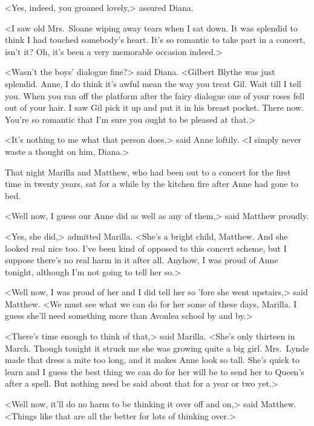 <Yes, indeed, you groaned lovely,> assured Diana.

<I saw old Mrs.~Sloane wiping away tears when I sat down. It was splendid to think I had touched somebody's heart. It's so romantic to take part in a concert, isn't it? Oh, it's been a very memorable occasion indeed.>

<Wasn't the boys' dialogue fine?> said Diana. <Gilbert Blythe was just splendid. Anne, I do think it's awful mean the way you treat Gil. Wait till I tell you. When you ran off the platform after the fairy dialogue one of your roses fell out of your hair. I saw Gil pick it up and put it in his breast pocket. There now. You're so romantic that I'm sure you ought to be pleased at that.>

<It's nothing to me what that person does,> said Anne loftily. <I simply never waste a thought on him, Diana.>

That night Marilla and Matthew, who had been out to a concert for the first time in twenty years, sat for a while by the kitchen fire after Anne had gone to bed.

<Well now, I guess our Anne did as well as any of them,> said Matthew proudly.

<Yes, she did,> admitted Marilla. <She's a bright child, Matthew. And she looked real nice too. I've been kind of opposed to this concert scheme, but I suppose there's no real harm in it after all. Anyhow, I was proud of Anne tonight, although I'm not going to tell her so.>

<Well now, I was proud of her and I did tell her so 'fore she went upstairs,> said Matthew. <We must see what we can do for her some of these days, Marilla. I guess she'll need something more than Avonlea school by and by.>

<There's time enough to think of that,> said Marilla. <She's only thirteen in March. Though tonight it struck me she was growing quite a big girl. Mrs.~Lynde made that dress a mite too long, and it makes Anne look so tall. She's quick to learn and I guess the best thing we can do for her will be to send her to Queen's after a spell. But nothing need be said about that for a year or two yet.>

<Well now, it'll do no harm to be thinking it over off and on,> said Matthew. <Things like that are all the better for lots of thinking over.>